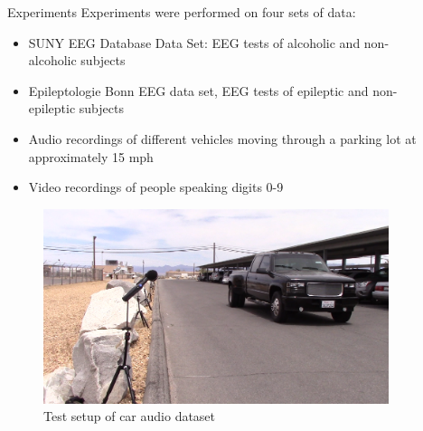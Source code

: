 \documentclass[final]{beamer}
\newlength{\sepwid}
\newlength{\onecolwid}
\begin{document}
\begin{frame}[t]
\begin{columns}[t]
\begin{column}{\onecolwid}
\end{column} %

\begin{column}{\sepwid}\end{column} %

\begin{column}{\onecolwid} %


\begin{block}{Experiments}
    Experiments were performed on four sets of data:
    \begin{itemize}
        \item SUNY EEG Database Data Set: EEG tests of alcoholic and non-alcoholic subjects
            \cite{zhang_event_1995}
        \item Epileptologie Bonn EEG data set, EEG tests of epileptic and non-epileptic subjects
            \cite{andrzejak_indications_2001}
        \item Audio recordings of different vehicles moving through a parking lot at approximately
            15 mph \cite{sunu_dimensionality_2018}
        \item Video recordings of people speaking digits 0-9 \cite{lieu_signal_2011}
    \end{itemize}


    \begin{figure}
        \includegraphics[width=0.8\linewidth]{images/car.png}
        \caption{Test setup of car audio dataset}
    \end{figure}


\end{block}
\end{column}
\end{columns}
\end{frame}
\end{document}
